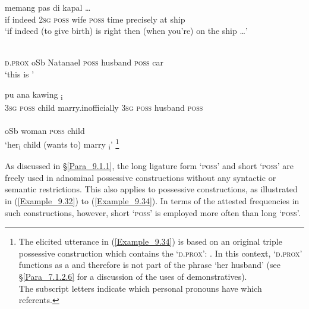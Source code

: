 \ea
\label{Example_9.32}
 {memang} {} {} {} {} {} {pas} {di} {kapal} {\ldots}\\ %
 if  indeed  2\textsc{sg}  \textsc{poss}  wife  \textsc{poss}  time  precisely  at  ship  \\
\glt 
‘if indeed  (to give birth) is right then (when you’re) on the ship {\ldots}’ \textstyleExampleSource{[080922-001a-CvPh.0010]}
\z

\ea
\label{Example_9.33}
 {} {} {} {} {} {}\\ %
 \textsc{d.prox}  oSb  Natanael  \textsc{poss}  husband  \textsc{poss}  car\\
\glt 
‘this is ’ \textstyleExampleSource{[081006-015-Cv.0001]}
\z

\ea
\label{Example_9.34}
 {{pu}} {ana} {{kawing}} {\textsubscript{i}} {} {} {}\\ %
 \textsc{3sg}  {\textsc{poss}}  child  {marry.inofficially}  \textsc{3sg}  \textsc{poss}  husband  \textsc{poss}\\
  {}    {}\\
 {oSb}  {woman}  \textsc{poss}  {child}\\
\glt 
‘her\textsubscript{i} child (wants to) marry \textsubscript{i}’ \textstyleExampleSource{[Elicited BR111020.026]}\footnote{The elicited utterance in (\ref{Example_9.34}) is based on an original triple possessive construction which contains the   ‘\textsc{d.prox}’: . In this context,  ‘\textsc{d.prox}’ functions as a  and therefore is not part of the  phrase  ‘her husband’ (see §\ref{Para_7.1.2.6} for a discussion of the  uses of demonstratives).\\
The subscript letters indicate which personal pronouns have which referents.}
\z



As discussed in §\ref{Para_9.1.1}, the long ligature form  ‘\textsc{poss}’ and short  ‘\textsc{poss}’ are freely used in adnominal possessive constructions without any syntactic or semantic restrictions. This also applies to  possessive constructions, as illustrated in (\ref{Example_9.32}) to (\ref{Example_9.34}). In terms of the attested frequencies in such constructions, however, short  ‘\textsc{poss}’ is employed more often than long  ‘\textsc{poss}’.


